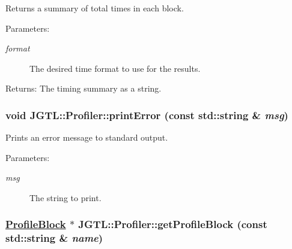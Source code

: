 Returns a summary of total times in each block.

\begin{Desc}
\item[Parameters:]
\begin{description}
\item[{\em format}]The desired time format to use for the results. \end{description}
\end{Desc}
\begin{Desc}
\item[Returns:]The timing summary as a string. \end{Desc}
\hypertarget{class_j_g_t_l_1_1_profiler_d246ea0daca1f81252ff2bd316ea6d08}{
\subsubsection[printError]{\setlength{\rightskip}{0pt plus 5cm}void JGTL::Profiler::print\-Error (const std::string \& {\em msg})}}
\label{class_j_g_t_l_1_1_profiler_d246ea0daca1f81252ff2bd316ea6d08}


Prints an error message to standard output.

\begin{Desc}
\item[Parameters:]
\begin{description}
\item[{\em msg}]The string to print. \end{description}
\end{Desc}
\hypertarget{class_j_g_t_l_1_1_profiler_cfa347cb9cc960c9c4fdf0d886785153}{
\subsubsection[getProfileBlock]{\setlength{\rightskip}{0pt plus 5cm}\hyperlink{struct_j_g_t_l_1_1_profile_block}{Profile\-Block} $\ast$ JGTL::Profiler::get\-Profile\-Block (const std::string \& {\em name})}}
\label{class_j_g_t_l_1_1_profiler_cfa347cb9cc960c9c4fdf0d886785153}



